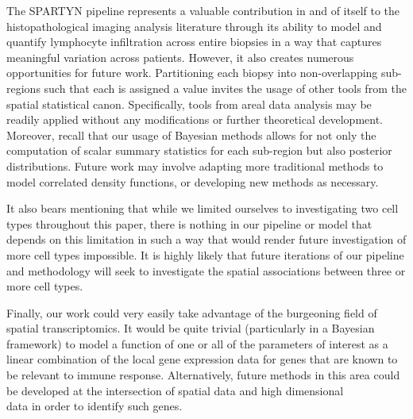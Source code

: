 \documentclass[
]{book}
\begin{document}
The SPARTYN pipeline represents a valuable contribution in and of
itself to the histopathological imaging analysis literature through
its ability to model and quantify lymphocyte infiltration across
entire biopsies in a way that captures meaningful variation across
patients. However, it also creates numerous opportunities for future
work. Partitioning each biopsy into non-overlapping sub-regions such
that each is assigned a value invites the usage of other tools from
the spatial statistical canon. Specifically, tools from areal data
analysis may be readily applied without any modifications or further
theoretical development. Moreover, recall that our usage of Bayesian
methods allows for not only the computation of scalar summary
statistics for each sub-region but also posterior distributions.
Future work may involve adapting more traditional methods to model
correlated density functions, or developing new methods as necessary.

It also bears mentioning that while we limited ourselves to investigating
two cell types throughout this paper, there is nothing in our pipeline
or model that depends on this limitation in such a way that would render
future investigation of more cell types impossible. It is highly likely
that future iterations of our pipeline and methodology will seek to
investigate the spatial associations between three or more cell types.

Finally, our work could very easily take advantage of the burgeoning
field of spatial transcriptomics. It would be quite trivial
(particularly in a Bayesian framework) to model a function of one or
all of the parameters of interest as a linear combination of the
local gene expression data for genes that are known to be relevant
to immune response. Alternatively, future methods in this area could
be developed at the intersection of spatial data and high dimensional\\
data in order to identify such genes.

  
\end{document}
